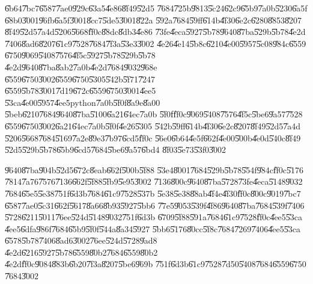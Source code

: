 \documentclass[12pt,a4paper]{article}
\begin{document}
\bigskip

\U{6b64}\U{7bc7}\U{6587}\U{7ae0}\U{929c}\U{63a5}\U{4e86}\U{8f49}\U{52d5}%
\U{7684}\U{725b}\U{9813}\U{5c24}\U{62c9}\U{65b9}\U{7a0b}\U{5230}\U{6a5f}%
\U{68b0}\U{3001}\U{96fb}\U{6a5f}\U{3001}\U{8cc7}\U{5de5}\U{3001}\U{822a}%
\U{592a}\U{7684}\U{59ff}\U{614b}\U{4f30}\U{6e2c}\U{6280}\U{8853}\U{8207}%
\U{8f49}\U{52d5}\U{7a4d}\U{5206}\U{5668}\U{ff0c}\U{88dc}\U{8db3}\U{4e86}%
\U{73fe}\U{4eca}\U{5927}\U{5b78}\U{9640}\U{87ba}\U{529b}\U{5b78}\U{4e2d}%
\U{7406}\U{8ad6}\U{8207}\U{61c9}\U{7528}\U{7684}\U{7f3a}\U{53e3}\U{3002}%
\U{4e26}\U{4e14}\U{5b8c}\U{6210}\U{4e00}\U{5957}\U{5c08}\U{984c}\U{6559}%
\U{6750}\U{9069}\U{5408}\U{7576}\U{4f5c}\U{5927}\U{5b78}\U{529b}\U{5b78}%
\U{4e2d}\U{9640}\U{87ba}\U{8ab2}\U{7a0b}\U{4e2d}\U{7684}\U{9032}\U{968e}%
\U{6559}\U{6750}\U{3002}\U{6559}\U{6750}\U{5305}\U{542b}\U{5f71}\U{7247}%
\U{6559}\U{5b78}\U{3001}\U{7d19}\U{672c}\U{6559}\U{6750}\U{3001}\U{4ee5}%
\U{53ca}\U{4e00}\U{5957}\U{4ee5}python\U{7a0b}\U{5f0f}\U{8a9e}\U{8a00}%
\U{5beb}\U{6210}\U{7684}\U{9640}\U{87ba}\U{5100}\U{6a21}\U{64ec}\U{7a0b}%
\U{5f0f}\U{ff0c}\U{9069}\U{5408}\U{7576}\U{4f5c}\U{5be6}\U{9a57}\U{7528}%
\U{6559}\U{6750}\U{3002}\U{6a21}\U{64ec}\U{7a0b}\U{5f0f}\U{4e26}\U{5305}%
\U{542b}\U{59ff}\U{614b}\U{4f30}\U{6e2c}\U{8207}\U{8f49}\U{52d5}\U{7a4d}%
\U{5206}\U{5668}\U{7684}\U{5169}\U{7a2e}\U{89e3}\U{7b97}\U{6cd5}\U{ff0c}%
\U{56e0}\U{6b64}\U{4e5f}\U{662f}\U{4e00}\U{500b}\U{4e0d}\U{540c}\U{8f49}%
\U{52d5}\U{529b}\U{5b78}\U{65b9}\U{6cd5}\U{7684}\U{5be6}\U{9a57}\U{6bd4}%
\U{8f03}\U{5e73}\U{53f0}\U{3002}

\bigskip

\U{9640}\U{87ba}\U{904b}\U{52d5}\U{672c}\U{8eab}\U{662f}\U{500b}\U{5f88}%
\U{53e4}\U{8001}\U{7684}\U{529b}\U{5b78}\U{554f}\U{984c}\U{ff0c}\U{5176}%
\U{7814}\U{7a76}\U{7576}\U{7136}\U{662f}\U{5f88}\U{5fb9}\U{5e95}\U{3002}%
\U{7136}\U{800c}\U{9640}\U{87ba}\U{5728}\U{73fe}\U{4eca}\U{5148}\U{9032}%
\U{7684}\U{65e5}\U{5e38}\U{751f}\U{6d3b}\U{7684}\U{61c9}\U{7528}\U{537b}%
\U{5e38}\U{5e38}\U{88ab}\U{4f4e}\U{4f30}\U{ff0c}\U{800c}\U{9019}\U{7bc7}%
\U{6587}\U{7ae0}\U{5c31}\U{662f}\U{5617}\U{8a66}\U{8b93}\U{5927}\U{5bb6}%
\U{77e5}\U{9053}\U{539f}\U{4f86}\U{9640}\U{87ba}\U{7684}\U{539f}\U{7406}%
\U{5728}\U{6211}\U{5011}\U{76ee}\U{524d}\U{5148}\U{9032}\U{751f}\U{6d3b}%
\U{6709}\U{5f88}\U{591a}\U{7684}\U{61c9}\U{7528}\U{ff0c}\U{4ee5}\U{53ca}%
\U{4ee5}\U{6dfa}\U{986f}\U{7684}\U{65b9}\U{5f0f}\U{544a}\U{8a34}\U{5927}%
\U{5bb6}\U{5176}\U{80cc}\U{5f8c}\U{7684}\U{7269}\U{7406}\U{4ee5}\U{53ca}%
\U{6578}\U{5b78}\U{7406}\U{8ad6}\U{3002}\U{76ee}\U{524d}\U{5728}\U{9ad8}%
\U{4e2d}\U{6216}\U{5927}\U{5b78}\U{6559}\U{80b2}\U{7684}\U{6559}\U{80b2}%
\U{4e2d}\U{ff0c}\U{9084}\U{883b}\U{6b20}\U{7f3a}\U{8207}\U{5be6}\U{969b}%
\U{751f}\U{6d3b}\U{61c9}\U{7528}\U{7d50}\U{5408}\U{7684}\U{6559}\U{6750}%
\U{7684}\U{3002}
\end{document}
